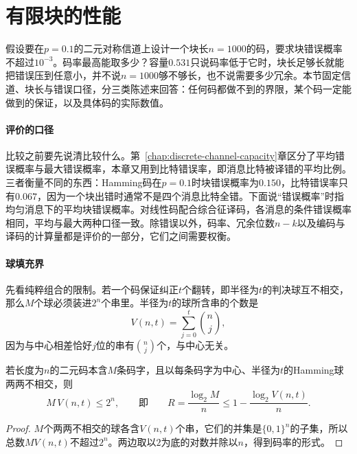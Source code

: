 \section{有限块的性能}
\label{sec:ccode-finite}

假设要在$p=0.1$的二元对称信道上设计一个块长$n=1000$的码，要求块错误概率不超过$10^{-3}$。码率最高能取多少？容量$0.531$只说码率低于它时，块长足够长就能把错误压到任意小，并不说$n=1000$够不够长，也不说需要多少冗余。本节固定信道、块长与错误口径，分三类陈述来回答：任何码都做不到的界限，某个码一定能做到的保证，以及具体码的实际数值。

\paragraph{评价的口径}
比较之前要先说清比较什么。第~\ref{chap:discrete-channel-capacity}章区分了平均错误概率与最大错误概率，本章又用到比特错误率，即消息比特被译错的平均比例。三者衡量不同的东西：Hamming码在$p=0.1$时块错误概率为$0.150$，比特错误率只有$0.067$，因为一个块出错时通常不是四个消息比特全错。下面说“错误概率”时指均匀消息下的平均块错误概率。对线性码配合综合征译码，各消息的条件错误概率相同，平均与最大两种口径一致。除错误以外，码率、冗余位数$n-k$以及编码与译码的计算量都是评价的一部分，它们之间需要权衡。

\paragraph{球填充界}
先看纯粹组合的限制。若一个码保证纠正$t$个翻转，即半径为$t$的判决球互不相交，那么$M$个球必须装进$2^{n}$个串里。半径为$t$的球所含串的个数是
\[
 V(n,t)=\sum_{j=0}^{t}\binom{n}{j} ,
\]
因为与中心相差恰好$j$位的串有$\binom nj$个，与中心无关。

\begin{theorem}[球填充界]
\label{thm:ccode-hamming-bound}
若长度为$n$的二元码本含$M$条码字，且以每条码字为中心、半径为$t$的Hamming球两两不相交，则
\begin{equation}
 M\,V(n,t)\leq2^{n},\qquad\text{即}\qquad R=\frac{\log_2M}{n}\leq1-\frac{\log_2V(n,t)}{n} .
 \label{eq:ccode-hamming-bound}
\end{equation}
\end{theorem}

\begin{proof}
$M$个两两不相交的球各含$V(n,t)$个串，它们的并集是$\{0,1\}^{n}$的子集，所以总数$MV(n,t)$不超过$2^{n}$。两边取以$2$为底的对数并除以$n$，得到码率的形式。
\end{proof}

